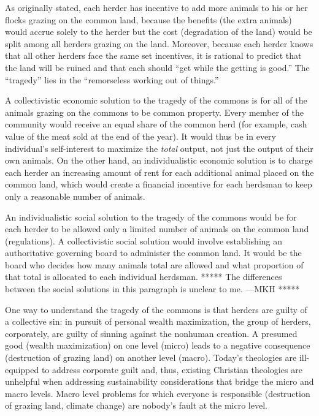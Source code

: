 \documentclass[12pt]{article}
\begin{document}
As originally stated, each herder has incentive 
to add more animals to his or her flocks grazing on the common land, because
the benefits (the extra animals) would accrue solely to the herder
but the cost (degradation of the land) 
would be split among all herders grazing on the land. 
Moreover, because each herder knows that all other herders face the same set incentives, 
it is rational to predict that the land will be ruined
and that each should ``get while the getting is good.''
The ``tragedy'' lies in the ``remorseless working out of things.''

A collectivistic economic solution to the tragedy of the commons 
is for all of the animals grazing on the commons to be common property. 
Every member of the community would receive an equal share of the common herd 
(for example, cash value of the meat sold at the end of the year). 
It would thus be in every individual's self-interest 
to maximize the \emph{total} output, 
not just the output of their own animals. 
On the other hand, 
an individualistic economic solution is to charge each herder an increasing amount of rent 
for each additional animal placed on the common land, 
which would create a financial incentive for each herdsman to keep
only a reasonable number of animals. 

An individualistic social solution to the tragedy of the commons 
would be for each herder to be allowed
only a limited number of animals on the common land (regulations). 
A collectivistic social solution would involve establishing 
an authoritative governing board
to administer the common land. 
It would be the board who decides how many animals total are allowed and what proportion
of that total is allocated to each individual herdsman.
***** The differences between the social solutions 
in this paragraph is unclear to me. ---MKH *****

One way to understand the tragedy of the commons
is that herders are guilty of a collective sin:
in pursuit of personal wealth maximization, 
the group of herders, corporately, are guilty of sinning against the nonhuman creation.
A presumed good (wealth maximization) on one level (micro)
leads to a negative consequence (destruction of grazing land) on another level (macro).
Today's theologies are ill-equipped to address corporate guilt
and, thus, existing Christian theologies are unhelpful 
when addressing sustainability considerations that bridge the micro and macro levels.
Macro level problems for which everyone is responsible 
(destruction of grazing land, climate change)
are nobody's fault at the micro level.
\end{document}
